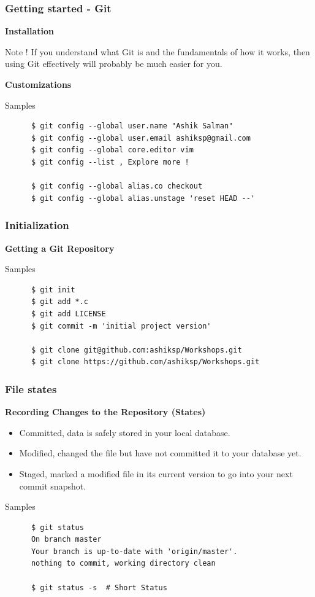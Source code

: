 \documentclass[10pt]{beamer}
\begin{document}
\begin{frame}[fragile]
  \frametitle{Getting started - Git}
  \textbf{Installation}
  \begin{exampleblock}{Note !}
    If you understand what Git is and the fundamentals of how it works, then using Git effectively
    will probably be much easier for you.
  \end{exampleblock}
  \textbf{Customizations} \\
  \pause
  \begin{block}{Samples}
    \begin{verbatim}
      $ git config --global user.name "Ashik Salman"
      $ git config --global user.email ashiksp@gmail.com
      $ git config --global core.editor vim
      $ git config --list , Explore more !

      $ git config --global alias.co checkout
      $ git config --global alias.unstage 'reset HEAD --'
    \end{verbatim}
  \end{block}
\end{frame}

\begin{frame}[fragile]
  \frametitle{Initialization}
  \textbf{Getting a Git Repository}
  \begin{block}{Samples}
    \begin{verbatim}
      $ git init
      $ git add *.c
      $ git add LICENSE
      $ git commit -m 'initial project version'

      $ git clone git@github.com:ashiksp/Workshops.git
      $ git clone https://github.com/ashiksp/Workshops.git
    \end{verbatim}
  \end{block}
\end{frame}

\begin{frame}[fragile]
  \frametitle{File states}
  \textbf{Recording Changes to the Repository (States)}
  \begin{itemize}
    \item \alert{Committed}, data is safely stored in your local database.
    \item \alert{Modified}, changed the file but have not committed it to your database yet.
    \item \alert{Staged}, marked a modified file in its current version to go into your next commit snapshot.
  \end{itemize}
  \begin{block}{Samples}
    \begin{verbatim}
      $ git status
      On branch master
      Your branch is up-to-date with 'origin/master'.
      nothing to commit, working directory clean

      $ git status -s  # Short Status
    \end{verbatim}
  \end{block}
\end{frame}
\end{document}
